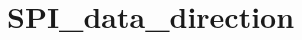 \hypertarget{group___s_p_i__data__direction}{\section{S\-P\-I\-\_\-data\-\_\-direction}
\label{group___s_p_i__data__direction}
}
